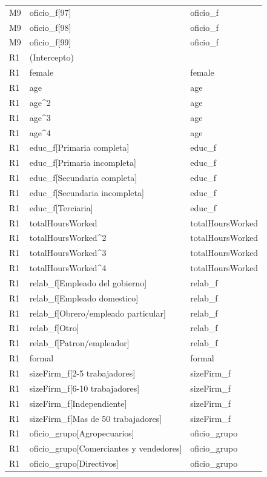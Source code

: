 \begin{longtable}{lll}
M9 & oficio\_f[97] & oficio\_f \\
M9 & oficio\_f[98] & oficio\_f \\
M9 & oficio\_f[99] & oficio\_f \\
R1 & (Intercepto) &  \\
R1 & female & female \\
R1 & age & age \\
R1 & age\textasciicircum 2 & age \\
R1 & age\textasciicircum 3 & age \\
R1 & age\textasciicircum 4 & age \\
R1 & educ\_f[Primaria completa] & educ\_f \\
R1 & educ\_f[Primaria incompleta] & educ\_f \\
R1 & educ\_f[Secundaria completa] & educ\_f \\
R1 & educ\_f[Secundaria incompleta] & educ\_f \\
R1 & educ\_f[Terciaria] & educ\_f \\
R1 & totalHoursWorked & totalHoursWorked \\
R1 & totalHoursWorked\textasciicircum 2 & totalHoursWorked \\
R1 & totalHoursWorked\textasciicircum 3 & totalHoursWorked \\
R1 & totalHoursWorked\textasciicircum 4 & totalHoursWorked \\
R1 & relab\_f[Empleado del gobierno] & relab\_f \\
R1 & relab\_f[Empleado domestico] & relab\_f \\
R1 & relab\_f[Obrero/empleado particular] & relab\_f \\
R1 & relab\_f[Otro] & relab\_f \\
R1 & relab\_f[Patron/empleador] & relab\_f \\
R1 & formal & formal \\
R1 & sizeFirm\_f[2-5 trabajadores] & sizeFirm\_f \\
R1 & sizeFirm\_f[6-10 trabajadores] & sizeFirm\_f \\
R1 & sizeFirm\_f[Independiente] & sizeFirm\_f \\
R1 & sizeFirm\_f[Mas de 50 trabajadores] & sizeFirm\_f \\
R1 & oficio\_grupo[Agropecuarios] & oficio\_grupo \\
R1 & oficio\_grupo[Comerciantes y vendedores] & oficio\_grupo \\
R1 & oficio\_grupo[Directivos] & oficio\_grupo \\

\end{longtable}
